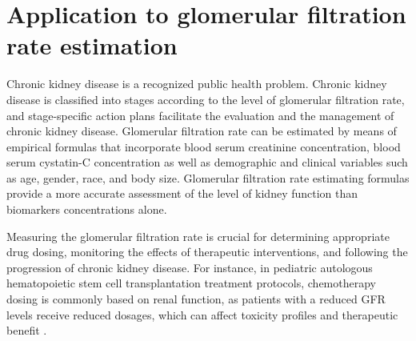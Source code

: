 \documentclass[10pt,final]{siamltex}
\begin{document}
\section{Application to glomerular filtration rate estimation}\label{gfr}
%
Chronic kidney disease is a recognized public health problem. Chronic kidney disease is classified into stages according to the level of glomerular filtration rate, and stage-specific action plans facilitate the evaluation and the management of chronic kidney disease. 
Glomerular filtration rate can be estimated by means of empirical formulas that incorporate blood serum creatinine concentration, blood serum cystatin-C concentration as well as demographic and clinical variables such as age, gender, race, and body size. Glomerular filtration rate estimating formulas provide a more accurate assessment of the level of kidney function than biomarkers concentrations alone. %

Measuring the glomerular filtration rate is crucial for determining appropriate drug dosing, monitoring the effects of therapeutic interventions, and following the progression of chronic kidney disease. For instance, in pediatric autologous hematopoietic stem cell transplantation treatment protocols, chemotherapy dosing is commonly based on renal function, as patients with a reduced GFR levels receive reduced dosages, which can affect toxicity profiles and therapeutic benefit \cite{laskin}.
%
\end{document}

